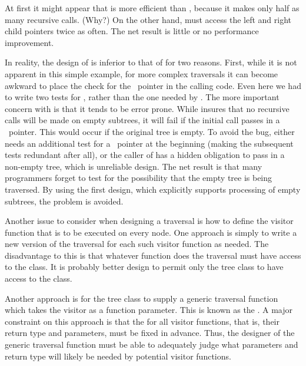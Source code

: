 
At first it might appear that  is more efficient
than , because it makes only half as many recursive
calls. (Why?)
On the other hand,  must access the left and right
child pointers twice as often.
The net result is little or no performance improvement.

In reality, the design of  is inferior to
that of  for two reasons.
First, while it is not apparent in this simple example,
for more complex traversals it can become awkward to place the check
for the \NULL\ pointer in the calling code.
Even here we had to write two tests for \NULL,
rather than the one needed by .
The more important concern with  is that it
tends to be error prone.
While  insures that no recursive
calls will be made on empty subtrees, it will fail if the initial call 
passes in a \NULL\ pointer.
This would occur if the original tree is empty.
To avoid the bug, either  needs
an additional test for a \NULL\ pointer at the beginning
(making the subsequent tests redundant after all), or the caller of
 has a hidden obligation to
pass in a non-empty tree, which is unreliable design.
The net result is that many programmers forget to test for the
possibility that the empty tree is being traversed.
By using the first design, which explicitly supports processing of
empty subtrees, the problem is avoided.

Another issue to consider when designing a traversal is how to
define the visitor function that is to be executed on every node.
One approach is simply to write a new version of the traversal for
each such visitor function as needed.
The disadvantage to this is that whatever function does the traversal
must have access to the  class.
It is probably better design to permit only the tree class to have
access to the  class.

Another approach is for the tree class to supply a generic traversal
function which takes the visitor
as a function parameter.
This is known as the
.
A major constraint on this approach is that the
 for all visitor functions, that is, their return
type and parameters, must be fixed in advance.
Thus, the designer of the generic traversal function must be able to
adequately judge what parameters and return type will likely be needed 
by potential visitor functions.

